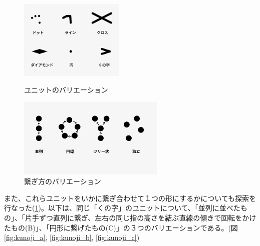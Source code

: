 \begin{figure}[htbp]
  \begin{minipage}[b]{0.5\linewidth}
    \includegraphics[width=5cm]{img/unit_valiation.png}
    \caption{ユニットのバリエーション}
    \label{fig:unit_valiation}
  \end{minipage}
  \begin{minipage}[b]{0.5\linewidth}
    \centering
    \includegraphics[width=7cm]{img/network.png}
    \caption{繋ぎ方のバリエーション}
    \label{fig:connection_valiation}
  \end{minipage}
\end{figure}

また、これらユニットをいかに繋ぎ合わせて１つの形にするかについても探索を行なった(\ref{fig:connection_valiation})。以下は、同じ「くの字」のユニットについて、「並列に並べたもの」、「片手ずつ直列に繋ぎ、左右の同じ指の高さを結ぶ直線の傾きで回転をかけたもの(B)」、「円形に繋げたもの(C)」の３つのバリエーションである。(図\ref{fig:kunoji_a}, \ref{fig:kunoji_b}, \ref{fig:kunoji_c})

